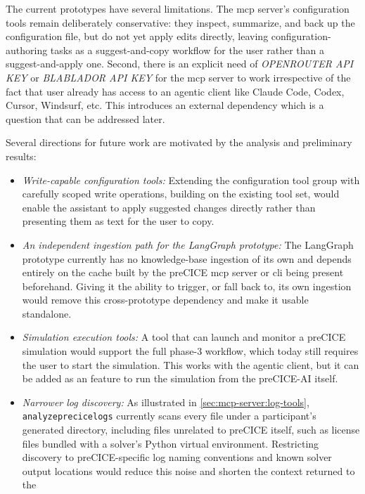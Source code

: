 \documentclass[
  numbers=noenddot,
  english,
  a4paper,
  twoside,
  bibliography=totoc,
  headsepline,
  cleardoublepage=empty,
  parskip=half,
  draft=false
]{scrbook}
\theoremstyle{break}
\renewcommand{\_}{\textunderscore\allowbreak}
\begin{document}
The current prototypes have several limitations.
The \gls{mcp} server's configuration tools remain deliberately conservative: they
inspect, summarize, and back up the configuration file, but do not yet apply edits directly,
leaving configuration-authoring tasks as a suggest-and-copy workflow for the user rather than a
suggest-and-apply one.
Second, there is an explicit need of \emph{OPENROUTER API KEY} or \emph{BLABLADOR API KEY} for the 
\gls{mcp} server to work irrespective of the fact that user already has access to an agentic client 
like Claude Code, Codex, Cursor, Windsurf, etc. This introduces an external dependency which is a 
question that can be addressed later.


Several directions for future work are motivated by the analysis and preliminary results:

\begin{itemize}
  \item \emph{Write-capable configuration tools:} Extending the configuration tool group with
        carefully scoped write operations, building on the existing tool set, would enable
        the assistant to apply suggested changes directly rather than presenting them as text
        for the user to copy.
  \item \emph{An independent ingestion path for the LangGraph prototype:} The LangGraph
        prototype currently has no knowledge-base ingestion of its own and depends entirely on
        the cache built by the preCICE \gls{mcp} server or \gls{cli} being present beforehand.
        Giving it the ability to trigger, or fall back to, its own ingestion would remove this
        cross-prototype dependency and make it usable standalone.
  \item \emph{Simulation execution tools:} A tool that can launch and monitor a preCICE
        simulation would support the full phase-3 workflow, which today still requires the user
        to start the simulation. This works with the agentic client, but it can be added as an feature to run the simulation from the preCICE-AI itself.
  \item \emph{Narrower log discovery:} As illustrated in \cref{sec:mcp-server:log-tools},
        \texttt{analyze\_precice\_logs} currently scans every file under a participant's
        generated directory, including files unrelated to preCICE itself, such as license
        files bundled with a solver's Python virtual environment.
        Restricting discovery to preCICE-specific log naming conventions and known solver
        output locations would reduce this noise and shorten the context returned to the

\end{itemize}
\end{document}
